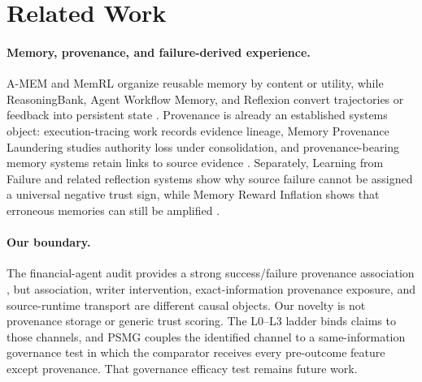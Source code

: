 \section{Related Work}
\paragraph{Memory, provenance, and failure-derived experience.}
A-MEM and MemRL organize reusable memory by content or utility, while ReasoningBank, Agent Workflow Memory, and Reflexion convert trajectories or feedback into persistent state \citep{xu2025amem,zhang2026memrl,ouyang2026reasoningbank,wang2024awm,shinn2023reflexion}. Provenance is already an established systems object: execution-tracing work records evidence lineage, Memory Provenance Laundering studies authority loss under consolidation, and provenance-bearing memory systems retain links to source evidence \citep{wang2026tracetotrust,xu2026laundering,joshi2026eywa,zhu2026tiermem,pham2026memorai}. Separately, Learning from Failure and related reflection systems show why source failure cannot be assigned a universal negative trust sign, while Memory Reward Inflation shows that erroneous memories can still be amplified \citep{sun2026learningfromfailure,liu2026rethinkingfeedback,allard2026erl,asadolahi2026inflation}.

\paragraph{Our boundary.}
The financial-agent audit provides a strong success/failure provenance association \citep{li2026audit}, but association, writer intervention, exact-information provenance exposure, and source-runtime transport are different causal objects. Our novelty is not provenance storage or generic trust scoring. The L0--L3 ladder binds claims to those channels, and PSMG couples the identified channel to a same-information governance test in which the comparator receives every pre-outcome feature except provenance. That governance efficacy test remains future work.
